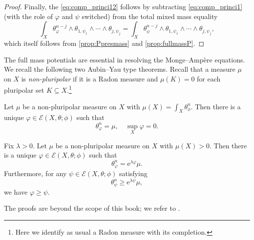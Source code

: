\begin{proof}
    Finally, the \eqref{eq:comp_princi12} follows by subtracting \eqref{eq:comp_princi1} (with the role of $\varphi$ and $\psi$ switched) from the total mixed mass equality
    \[
        \int_X\theta_\varphi^{n-j}\wedge \theta_{1,\psi_1}\wedge\cdots\wedge\theta_{j,\psi_j}= \int_X\theta_\psi^{n-j}\wedge \theta_{1,\psi_1}\wedge\cdots\wedge\theta_{j,\psi_j},
    \]
    which itself follows from \cref{prop:Ppresmass} and \cref{prop:fullmassP}.
\end{proof}

The full mass potentials are essential in resolving the Monge--Ampère equations. We recall the following two Aubin--Yau type theorems. Recall that a measure $\mu$ on $X$ is \emph{non-pluripolar} if it is a Radon measure and $\mu(K)=0$ for each pluripolar set $K\subseteq X$.\footnote{Here we identify as usual a Radon measure with its completion.}
\begin{theorem}\label{thm:Yau_rel}
    Let $\mu$ be a non-pluripolar measure on $X$ with $\mu(X)=\int_X \theta_{\phi}^n$. Then there is a unique $\varphi\in \mathcal{E}(X,\theta;\phi)$ such that
    \[
    \theta_{\varphi}^n=\mu,\quad \sup_X \varphi=0.
    \]
\end{theorem}


\begin{theorem}\label{thm:AY_rel}
    Fix $\lambda>0$. Let $\mu$ be a non-pluripolar measure on $X$ with $\mu(X)>0$. Then there is a unique $\varphi\in \mathcal{E}(X,\theta;\phi)$ such that
    \[
    \theta_{\varphi}^n=\mathrm{e}^{\lambda\varphi}\mu.
    \]
    Furthermore, for any $\psi\in \mathcal{E}(X,\theta;\phi)$ satisfying
    \[
    \theta_{\psi}^n\geq \mathrm{e}^{\lambda\psi}\mu,
    \]
    we have $\varphi\geq \psi$.
\end{theorem}
The proofs are beyond the scope of this book; we refer to \cite{DDNL19log}.

